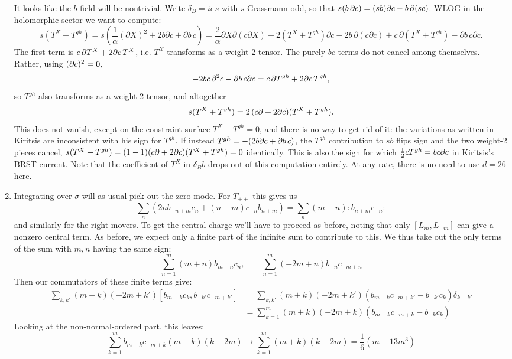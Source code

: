 \documentclass[11pt, class=article, crop=false]{standalone}
\begin{document}
\begin{enumerate}
	  It looks like the $b$ field will be nontrivial. Write $\delta_B = i \epsilon\, s$ with $s$ Grassmann-odd, so that $s(b\, \d c) = (s b) \d c - b\, \d (s c)$. WLOG in the holomorphic sector we want to compute:
	  	  \[
	  	  	s (T^X + T^{gh}) = s \left(\frac1\alpha (\partial X)^2 + 2 b \partial c + \partial b\, c\right) = \frac2\alpha \partial X \partial(c \partial X) + 2 (T^X + T^{gh}) \partial c - 2 b\, \partial(c \partial c) + c\, \partial(T^X + T^{gh}) - \partial b\, c \partial c.
	  	  \]
		  The first term is $c\, \d T^X + 2 \d c\, T^X$, i.e. $T^X$ transforms as a weight-2 tensor. The purely $b c$ terms do not cancel among themselves. Rather, using $(\d c)^2 = 0$,
		  \[
		  	- 2 b c\, \d^2 c - \d b\, c \d c = c\, \d T^{gh} + 2 \d c\, T^{gh},
		  \]
		  so $T^{gh}$ also transforms as a weight-2 tensor, and altogether
		  \[
		  	s (T^X + T^{gh}) = 2\, (c \d + 2 \d c)(T^X + T^{gh}).
		  \]
		  This does not vanish, except on the constraint surface $T^X + T^{gh} = 0$, and there is no way to get rid of it: the variations as written in Kiritsis are inconsistent with his sign for $T^{gh}$. If instead $T^{gh} = -(2 b \d c + \d b\, c)$, the $T^{gh}$ contribution to $s b$ flips sign and the two weight-2 pieces cancel, $s(T^X + T^{gh}) = (1 - 1)(c \d + 2 \d c)(T^X + T^{gh}) = 0$ identically. This is also the sign for which $\frac12 c T^{gh} = b c \d c$ in Kiritsis's BRST current. Note that the coefficient of $T^X$ in $\delta_B b$ drops out of this computation entirely. At any rate, there is no need to use $d=26$ here.
	  
	  \item Integrating over $\sigma$ will as usual pick out the zero mode. For $T_{++}$ this gives us
	  \[
	  	\sum_n (2 n b_{-n+m} c_n + (n+m) c_{-n} b_{n+m}) = \sum_n (m-n) :b_{n+m} c_{-n}:
	  \]
	  and similarly for the right-movers. To get the central charge we'll have to proceed as before, noting that only $[L_m, L_{-m}]$ can give a nonzero central term. As before, we expect only a finite part of the infinite sum to contribute to this. We thus take out the only terms of the sum with $m,n$ having the same sign:
	  \[
	  	\sum_{n=1}^m (m+n) b_{m-n} c_n , \qquad \sum_{n=1}^m (-2m+n) b_{-n} c_{-m+n}
	  \]
	  Then our commutators of these finite terms give:
	  \[
	  \begin{aligned}
	  		  	\sum_{k, k'} (m+k) (-2m + k') [b_{m-k} c_k, b_{-k'} c_{-m+k'}]
				&= \sum_{k, k'} (m+k) (-2m + k') (b_{m-k} c_{-m+k'}  - b_{-k'} c_{k}) \delta_{k - k'}\\
				& = \sum_{k=1}^m (m+k) (-2m +k)(b_{m-k} c_{-m+k} - b_{-k} c_k)
	  \end{aligned}
	  \]
	  Looking at the non-normal-ordered part, this leaves:
	  \[
	  	\sum_{k=1}^m b_{m-k} c_{-m+k} (m+k) (k-2m) \to \sum_{k=1}^m (m+k)(k-2m) = \frac{1}{6} (m - 13m^3)
	  \]
	  

\end{enumerate}
\end{document}
